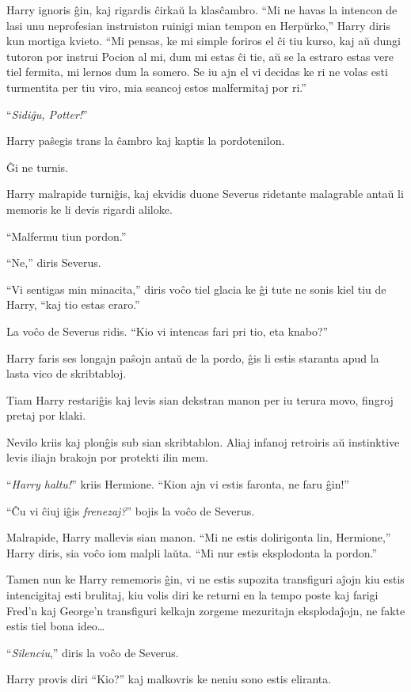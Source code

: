 Harry ignoris ĝin, kaj rigardis ĉirkaŭ la klasĉambro. ``Mi ne havas la
intencon de lasi unu neprofesian instruiston ruinigi mian tempon en
Herpŭrko,'' Harry diris kun mortiga kvieto. ``Mi pensas, ke mi simple
foriros el ĉi tiu kurso, kaj aŭ dungi tutoron por instrui Pocion al mi,
dum mi estas ĉi tie, aŭ se la estraro estas vere tiel fermita, mi
lernos dum la somero. Se iu ajn el vi decidas ke ri ne volas esti
turmentita per tiu viro, mia seancoj estos malfermitaj por ri.''

``\emph{Sidiĝu, Potter!}''

Harry paŝegis trans la ĉambro kaj kaptis la pordotenilon.

Ĝi ne turnis.

Harry malrapide turniĝis, kaj ekvidis duone Severus ridetante
malagrable antaŭ li memoris ke li devis rigardi aliloke.

``Malfermu tiun pordon.''

``Ne,'' diris Severus.

``Vi sentigas min minacita,'' diris voĉo tiel glacia ke ĝi tute ne sonis
kiel tiu de Harry, ``kaj tio estas eraro.''

La voĉo de Severus ridis. ``Kio vi intencas fari pri tio, eta knabo?''

Harry faris ses longajn paŝojn antaŭ de la pordo, ĝis li estis
staranta apud la lasta vico de skribtabloj.

Tiam Harry restariĝis kaj levis sian dekstran manon per iu terura
movo, fingroj pretaj por klaki.

Nevilo kriis kaj plonĝis sub sian skribtablon. Aliaj infanoj retroiris
aŭ instinktive levis iliajn brakojn por protekti ilin mem.

``\emph{Harry haltu!}'' kriis Hermione. ``Kion ajn vi estis faronta,
ne faru ĝin!''

``Ĉu vi ĉiuj iĝis \emph{frenezaj?}'' bojis la voĉo de Severus.

Malrapide, Harry mallevis sian manon. ``Mi ne estis dolirigonta lin,
Hermione,'' Harry diris, sia voĉo iom malpli laŭta. ``Mi nur estis
eksplodonta la pordon.''

Tamen nun ke Harry rememoris ĝin, vi ne estis supozita transfiguri
aĵojn kiu estis intencigitaj esti brulitaj, kiu volis diri ke returni en
la tempo poste kaj farigi Fred'n kaj George'n transfiguri kelkajn zorgeme
mezuritajn eksplodaĵojn, ne fakte estis tiel bona ideo\ldots

``\emph{Silenciu},'' diris la voĉo de Severus.

Harry provis diri ``Kio?'' kaj malkovris ke neniu sono estis
eliranta.

